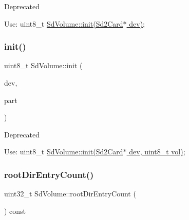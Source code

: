 \begin{DoxyRefDesc}{Deprecated}
\item[\hyperlink{deprecated__deprecated000012}{Deprecated}]Use\+: uint8\+\_\+t \hyperlink{class_sd_volume_adfcf83cba537b831f3a993a058e7ca85}{Sd\+Volume\+::init(\+Sd2\+Card$\ast$ dev)}; \end{DoxyRefDesc}
\mbox{\label{class_sd_volume_a51d8b4c5dd7372eb7dec486472139eb5}} 
\subsubsection{\texorpdfstring{init()}{init()}\hspace{0.1cm}{\footnotesize\ttfamily [4/4]}}
{\footnotesize\ttfamily uint8\+\_\+t Sd\+Volume\+::init (\begin{DoxyParamCaption}\item[{\hyperlink{class_sd2_card}{Sd2\+Card} \&}]{dev,  }\item[{uint8\+\_\+t}]{part }\end{DoxyParamCaption})\hspace{0.3cm}{\ttfamily [inline]}}

\begin{DoxyRefDesc}{Deprecated}
\item[\hyperlink{deprecated__deprecated000013}{Deprecated}]Use\+: uint8\+\_\+t \hyperlink{class_sd_volume_a8f5879e458ea6f1a2a2a2b884d800550}{Sd\+Volume\+::init(\+Sd2\+Card$\ast$ dev, uint8\+\_\+t vol)}; \end{DoxyRefDesc}
\mbox{\label{class_sd_volume_addfdd68b9d9f728ac29d38f78c3fbead}} 
\subsubsection{\texorpdfstring{root\+Dir\+Entry\+Count()}{rootDirEntryCount()}}
{\footnotesize\ttfamily uint32\+\_\+t Sd\+Volume\+::root\+Dir\+Entry\+Count (\begin{DoxyParamCaption}\item[{void}]{ }\end{DoxyParamCaption}) const\hspace{0.3cm}{\ttfamily [inline]}}

